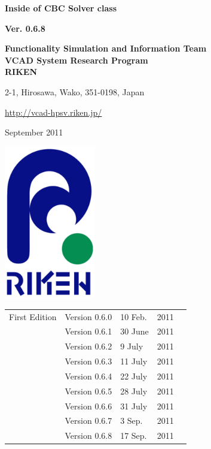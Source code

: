 \documentclass[a4paper,10pt,oneside,fleqn]{jsbook}
\begin{document}
\begin{titlepage}
\begin{center}
\vspace*{3cm}
{\huge \textbf{Inside of CBC Solver class}}\\
\vspace{1cm}

{\large \textbf{Ver. 0.6.8}}\\
\vspace{1.5cm}

{\large \textbf{Functionality Simulation and Information Team}\\
\large \textbf{VCAD System Research Program}\\
\large \textbf{RIKEN}\\
\vspace{1cm}
}

{\large 2-1, Hirosawa, Wako, 351-0198, Japan}\\
\vspace{0.5cm}

\url{http://vcad-hpsv.riken.jp/}\\
\vspace{1cm}

September 2011\\
\vspace{4cm}

\includegraphics[width=4cm,bb=-80 0 220 500]{RIKEN_logo_300x500.eps}

\end{center}
\end{titlepage}
\newpage

%
\frontmatter

\begin{tabular}{llllr}
First Edition  &  Version 0.6.0  & 10 Feb.  & 2011\\
               &  Version 0.6.1  & 30 June  & 2011\\
               &  Version 0.6.2  &  9 July  & 2011\\
               &  Version 0.6.3  & 11 July  & 2011\\
               &  Version 0.6.4  & 22 July  & 2011\\
               &  Version 0.6.5  & 28 July  & 2011\\
               &  Version 0.6.6  & 31 July  & 2011\\
               &  Version 0.6.7  &  3 Sep.  & 2011\\
               &  Version 0.6.8  & 17 Sep.  & 2011


\end{tabular}
\end{document}
